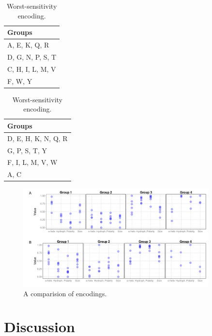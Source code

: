 \documentclass[fleqn,10pt,twoside]{gcb15submission}
\begin{document}
\begin{table}[ht]
\begin{minipage}{.5\linewidth} 
\centering
\begin{tabular}{l}
  \toprule
Groups \\ 
  \midrule
A, E, K, Q, R \\ 
   \rowcolor[gray]{0.85}D, G, N, P, S, T \\ 
  C, H, I, L, M, V \\ 
   \rowcolor[gray]{0.85}F, W, Y \\ 
   \bottomrule
\end{tabular}
\caption{Best-sensitivity (final) encoding.} 
\label{tab:best}
\end{minipage}
\begin{minipage}{.5\linewidth} 
\centering
\begin{tabular}{l}
  \toprule
Groups \\ 
  \midrule
D, E, H, K, N, Q, R \\ 
   \rowcolor[gray]{0.85}G, P, S, T, Y \\ 
  F, I, L, M, V, W \\ 
   \rowcolor[gray]{0.85}A, C \\ 
   \bottomrule
\end{tabular}
\caption{Worst-sensitivity encoding.} 
\label{tab:worst}
\end{minipage}
\end{table}


\begin{figure}[ht]\centering
\includegraphics[width=0.9\textwidth]{figures/enccomp.png}
\caption{A comparision of encodings.}
\label{fig:enccomp}
\end{figure}

\section*{Discussion}
\end{document}
